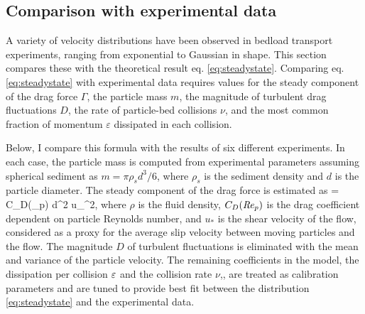 \subsection{Comparison with experimental data}
\label{sec:langexperimentcomparison}

A variety of velocity distributions have been observed in bedload transport experiments, ranging from exponential to Gaussian in shape. 
This section compares these with the theoretical result eq. \ref{eq:steadystate}.
Comparing eq. \ref{eq:steadystate} with experimental data requires values for the steady component of the drag force $\Gamma$, the particle mass $m$, the magnitude of turbulent drag fluctuations $D$, the rate of particle-bed collisions $\nu$, and the most common fraction of momentum $\varepsilon$ dissipated in each collision.

Below, I compare this formula with the results of six different experiments.
In each case, the particle mass is computed from experimental parameters assuming spherical sediment as $m = \pi \rho_s d^3/6$, where $\rho_s$ is the sediment density and $d$ is the particle diameter. The steady component of the drag force is estimated as
\be \Gamma =  \rho C_D(\Rey_p) d^2 u_\ast^2,\ee
where $\rho$ is the fluid density, $C_D(\mbox{\textit{Re}}_p)$ is the drag coefficient dependent on particle Reynolds number, and $u_\ast$ is the shear velocity of the flow, considered as a proxy for the average slip velocity between moving particles and the flow. The magnitude $D$ of turbulent fluctuations is eliminated with the mean and variance of the particle velocity. The remaining coefficients in the model, the dissipation per collision $\varepsilon$ and the collision rate $\nu$,, are treated as calibration parameters and are tuned to provide best fit between the distribution \ref{eq:steadystate} and the experimental data.

